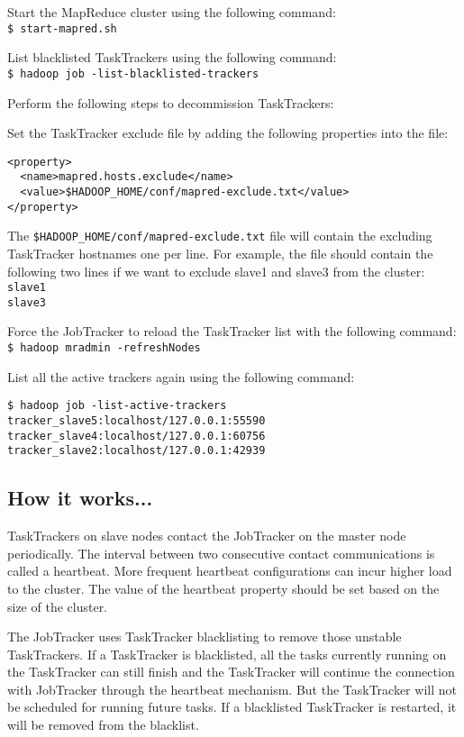 Start the MapReduce cluster using the following command: \\
\verb|$ start-mapred.sh|

List blacklisted TaskTrackers using the following command: \\
\verb|$ hadoop job -list-blacklisted-trackers|

Perform the following steps to decommission TaskTrackers: 

Set the TaskTracker exclude file by adding the following properties into the file:
\begin{verbatim}
<property>
  <name>mapred.hosts.exclude</name>
  <value>$HADOOP_HOME/conf/mapred-exclude.txt</value>
</property>
\end{verbatim}

The \verb|$HADOOP_HOME/conf/mapred-exclude.txt| file will contain the excluding TaskTracker hostnames one per line. For example, the file should contain the following two lines if we want to exclude slave1 and slave3 from the cluster: \\
\verb|slave1| \\
\verb|slave3| 

Force the JobTracker to reload the TaskTracker list with the following command: \\
\verb|$ hadoop mradmin -refreshNodes|

List all the active trackers again using the following command:
\begin{verbatim}
$ hadoop job -list-active-trackers
tracker_slave5:localhost/127.0.0.1:55590
tracker_slave4:localhost/127.0.0.1:60756
tracker_slave2:localhost/127.0.0.1:42939
\end{verbatim}

\subsection*{How it works...}
TaskTrackers on slave nodes contact the JobTracker on the master node periodically. The interval between two consecutive contact communications is called a heartbeat. More frequent heartbeat configurations can incur higher load to the cluster. The value of the heartbeat property should be set based on the size of the cluster.

The JobTracker uses TaskTracker blacklisting to remove those unstable TaskTrackers. If a TaskTracker is blacklisted, all the tasks currently running on the TaskTracker can still finish and the TaskTracker will continue the connection with JobTracker through the heartbeat mechanism. But the TaskTracker will not be scheduled for running future tasks. If a blacklisted TaskTracker is restarted, it will be removed from the blacklist.

